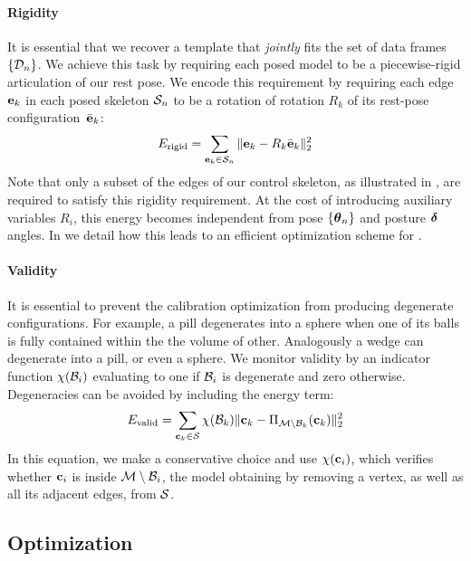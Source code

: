 \paragraph{Rigidity}
It is essential that we recover a template that \emph{jointly} fits the set of data frames $\{ \mathcal{D}_n \}$. We achieve this task by requiring each posed model to be a piecewise-rigid articulation of our rest pose. We encode this requirement by requiring each edge $\mathbf{e}_k$ in each posed skeleton $\mathcal{S}_n$ to be a rotation of rotation $R_{k}$ of its rest-pose configuration~$\bar{\mathbf{e}}_k$: 
% 
\begin{equation}
E_{\text{rigid}} = \sum_{\mathbf{e}_k \in \mathcal{S}_n} \| \mathbf{e}_k - R_{k}{\bar{\mathbf{e}}_k} \|_2^2
\label{eq:rigidity}
\end{equation} 
Note that only a subset of the edges of our control skeleton, as illustrated in , are required to satisfy this rigidity requirement. At the cost of introducing auxiliary variables $R_{i}$, this energy becomes independent from pose ${\{\boldsymbol{\theta}_n\}}$ and posture $\boldsymbol{\delta}$ angles. In  we detail how this leads to an efficient optimization scheme for . 

\paragraph{Validity}
It is essential to prevent the calibration optimization from producing degenerate configurations. For example, a pill degenerates into a sphere when one of its balls is fully contained within the the volume of other. Analogously a wedge can degenerate into a pill, or even a sphere. We monitor validity by an indicator function $\chi(\mathcal{B}_i)$ evaluating to one if $\mathcal{B}_i$ is degenerate and zero otherwise.
Degeneracies can be avoided by including the energy term:
% 
\begin{equation}
E_{\text{valid}} = \sum_{\mathbf{c}_k \in \mathcal{S}} \chi(\mathcal{B}_k) \| \mathbf{c}_k - \Pi_{\mathcal{M} \setminus \mathcal{B}_k}(\mathbf{c}_k) \|_2^2
\end{equation}
% 
In this equation, we make a conservative choice and use $\chi(\mathbf{c}_i)$, which verifies whether $\mathbf{c}_i$ is inside $\mathcal{M} \setminus \mathcal{B}_i$, the model obtaining by removing a vertex, as well as all its adjacent edges, from $\mathcal{S}$. 

\subsection{Optimization }
\label{sec:optimization}

